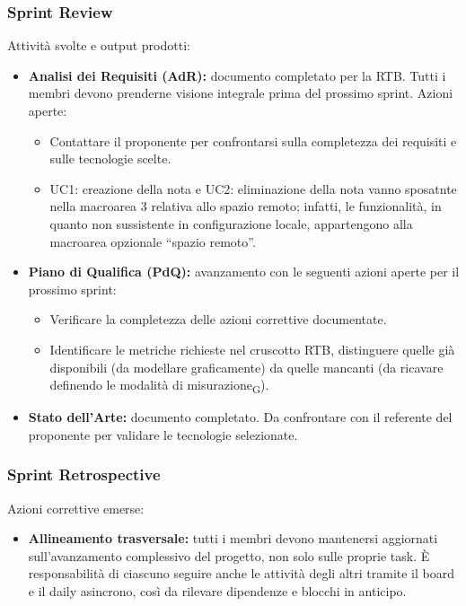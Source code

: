 \subsubsection{Sprint Review}
Attività svolte e output prodotti:
\begin{itemize}
    \item \textbf{Analisi dei Requisiti (AdR):} documento completato per la
          RTB. Tutti i membri devono prenderne visione
          integrale prima del prossimo sprint. Azioni aperte:
          \begin{itemize}
              \item Contattare il proponente per confrontarsi sulla completezza
                    dei requisiti e sulle tecnologie scelte.
              \item UC1: creazione della nota e UC2: eliminazione della nota vanno sposatnte nella macroarea 3 relativa allo spazio remoto; infatti, le funzionalità, in quanto non sussistente in configurazione locale,
                   appartengono alla macroarea opzionale ``spazio remoto''.
          \end{itemize}
    \item \textbf{Piano di Qualifica (PdQ):} avanzamento con le seguenti
          azioni aperte per il prossimo sprint:
          \begin{itemize}
              \item Verificare la completezza delle azioni correttive documentate.
              \item Identificare le metriche richieste nel cruscotto RTB, distinguere
                    quelle già disponibili (da modellare graficamente) da quelle
                    mancanti (da ricavare definendo le modalità di misurazione\textsubscript{G}).
          \end{itemize}
    \item \textbf{Stato dell'Arte:} documento completato. Da confrontare con
          il referente del proponente per validare le tecnologie selezionate.
\end{itemize}

\subsubsection{Sprint Retrospective}
Azioni correttive emerse:
\begin{itemize}
    \item \textbf{Allineamento trasversale:} tutti i membri devono mantenersi
          aggiornati sull'avanzamento complessivo del progetto, non solo sulle
          proprie task. È responsabilità di ciascuno seguire anche le attività
          degli altri tramite il board e il daily asincrono, così da rilevare
          dipendenze e blocchi in anticipo.
\end{itemize}

